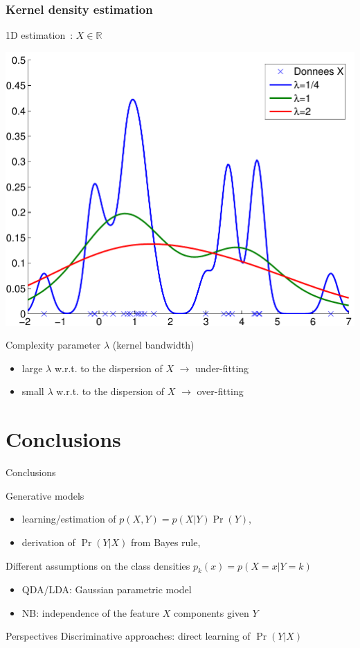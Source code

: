 \documentclass[compress, smaller, serif, 9pt]{beamer}
\begin{document}
\begin{frame}
 \frametitle{Kernel density estimation}
\begin{block}{1D estimation~: $X \in \mathbb{R}$ }
\end{block}
\vspace*{-6mm}

\begin{center}
  \includegraphics[width=.6\textwidth]{kernel_estimate.pdf} \\
\end{center}
\begin{block}{Complexity parameter $\lambda$ (kernel bandwidth)}
\vspace*{-2mm}
\begin{itemize}
   \item large $\lambda$ w.r.t. to the dispersion of  $X$  $\rightarrow$
   \alert{under-fitting}
   \item small $\lambda$ w.r.t. to the dispersion of  $X$ $\rightarrow$
   \alert{over-fitting}
\end{itemize}
\end{block}


\end{frame}

\section{Conclusions}

\begin{frame}{Conclusions}
\begin{block}{Generative models}
   \begin{itemize}
      \item learning/estimation of $p(X,Y)= p(X | Y) \Pr{(Y)}$,
      \item derivation of $\Pr{(Y | X)}$ from Bayes rule,
   \end{itemize}
   Different assumptions on the class densities $p_k(x)=p(X=x|Y=k)$
      \begin{itemize}
      \item QDA/LDA: Gaussian parametric model
      \item NB: independence of the feature $X$ components given $Y$
   \end{itemize}
\end{block}
\begin{block}{Perspectives}
   Discriminative approaches: direct learning of  $\Pr{(Y | X)}$
\end{block}


\end{frame}
\end{document}
